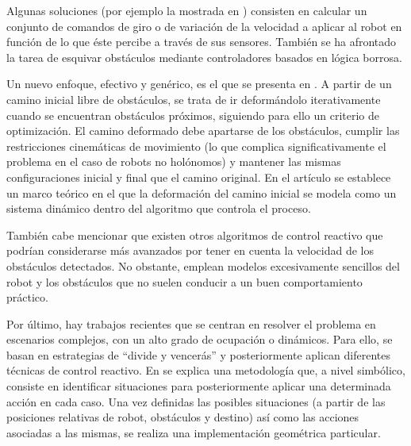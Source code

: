 Algunas soluciones (por ejemplo la mostrada en \cite{Feiten94}) consisten en calcular un conjunto de comandos de giro o de variación de la velocidad a aplicar al robot en función de lo que éste percibe a través de sus sensores. También se ha afrontado la tarea de esquivar obstáculos mediante controladores basados en lógica borrosa.

Un nuevo enfoque, efectivo y genérico, es el que se presenta en \cite{Lamiraux04}. A partir de un camino inicial libre de obstáculos, se trata de ir deformándolo iterativamente cuando se encuentran obstáculos próximos, siguiendo para ello un criterio de optimización. El camino deformado debe apartarse de los obstáculos, cumplir las restricciones cinemáticas de movimiento (lo que complica significativamente el problema en el caso de robots no holónomos) y mantener las mismas configuraciones inicial y final que el camino original. En el artículo se establece un marco teórico en el que la deformación del camino inicial se modela como un sistema dinámico dentro del algoritmo que controla el proceso.

También cabe mencionar que existen otros algoritmos de control reactivo que podrían considerarse más avanzados por tener en cuenta la velocidad de los obstáculos detectados. No obstante, emplean modelos excesivamente sencillos del robot y los obstáculos que no suelen conducir a un buen comportamiento práctico.

Por último, hay trabajos recientes que se centran en resolver el problema en escenarios complejos, con un alto grado de ocupación o dinámicos. Para ello, se basan en estrategias de “divide y vencerás” y posteriormente aplican diferentes técnicas de control reactivo. En \cite{Minguez04} se explica una metodología que, a nivel simbólico, consiste en identificar situaciones para posteriormente aplicar una determinada acción en cada caso. Una vez definidas las posibles situaciones (a partir de las posiciones relativas de robot, obstáculos y destino) así como las acciones asociadas a las mismas, se realiza una implementación geométrica particular.

